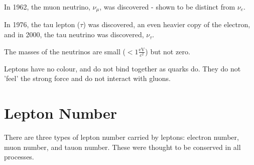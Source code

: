 \documentclass[10pt,a4paper]{article}
\begin{document}
In 1962, the muon neutrino, $\nu_{\mu}$, was discovered - shown to be distinct from $\nu_e$.

In 1976, the tau lepton ($\tau$) was discovered, an even heavier copy of the electron, and in 2000, the tau neutrino was discovered, $\nu_{\tau}$.

The masses of the neutrinos are small ($< 1 \frac{\mathrm{eV}}{c^2}$) but not zero.

Leptons have no colour, and do not bind together as quarks do. They do not 'feel' the strong force and do not interact with gluons.

\section*{Lepton Number}

There are three types of lepton number carried by leptons: electron number, muon number, and tauon number. These were thought to be conserved in all processes.
\end{document}
